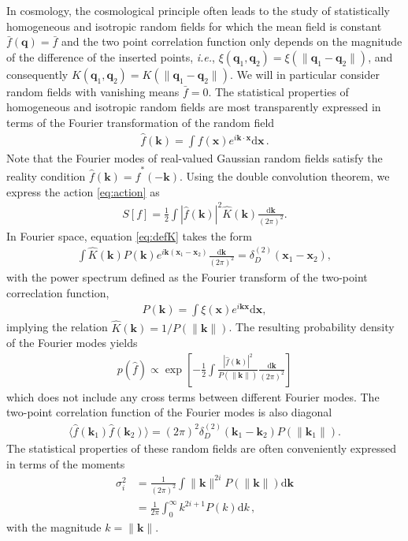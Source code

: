\documentclass[a4paper, 11pt]{article}
\begin{document}
In cosmology, the cosmological principle often leads to the study of statistically homogeneous and isotropic random fields for which the mean field is constant $\bar{f}(\bm{q})=\bar{f}$ and the two point correlation function only depends on the magnitude of the difference of the inserted points, \textit{i.e.}, $\xi(\bm{q}_1,\bm{q}_2)=\xi(\|\bm{q}_1-\bm{q}_2\|)$, and consequently $K(\bm{q}_1,\bm{q}_2)=K(\|\bm{q}_1-\bm{q}_2\|)$. We will in particular consider random fields with vanishing means $\bar{f}=0$. The statistical properties of homogeneous and isotropic random fields are most transparently expressed in terms of the Fourier transformation of the random field
\begin{align}
\hat{f}(\bm{k}) = \int f(\bm{x})e^{i\bm{k}\cdot \bm{x}}\mathrm{d}\bm{x}\,.
\end{align}
Note that the Fourier modes of real-valued Gaussian random fields satisfy the reality condition $\hat{f}(\bm{k}) = \hat{f}^*(-\bm{k})$. Using the double convolution theorem, we express the action \eqref{eq:action} as
\begin{align}
S[f] = \frac{1}{2} \int |\hat{f}(\bm{k})|^2 \hat{K}(\bm{k}) \frac{\mathrm{d}\bm{k}}{(2\pi)^2}.
\end{align}
In Fourier space, equation \eqref{eq:defK} takes the form
\begin{align}
\int \hat{K}(\bm{k}) P(\bm{k}) e^{i\bm{k}(\bm{x}_1-\bm{x}_2)} \frac{\mathrm{d}\bm{k}}{(2\pi)^2} = \delta_D^{(2)}(\bm{x}_1 - \bm{x}_2),
\end{align}
with the power spectrum defined as the Fourier transform of the two-point correclation function,
\begin{align}
P(\bm{k}) = \int \xi(\bm{x}) e^{i\bm{k}\bm{x}}\mathrm{d}\bm{x},
\end{align}
implying the relation $\hat{K}(\bm{k}) = 1/P(\|\bm{k}\|)$. The resulting probability density of the Fourier modes yields
\begin{align}
p(\hat{f}) \propto \exp\left[ -\frac{1}{2} \int \frac{|\hat{f}(\bm{k})|^2}{P(\|\bm{k}\|)} \frac{\mathrm{d}\bm{k}}{(2\pi)^2}\right]
\end{align}
which does not include any cross terms between different Fourier modes. The two-point correlation function of the Fourier modes is also diagonal
\begin{align}
\langle \hat{f}(\bm{k}_1)\hat{f}(\bm{k}_2) \rangle = (2\pi)^2 \delta_D^{(2)}(\bm{k}_1-\bm{k}_2) P(\|\bm{k}_1\|).
\end{align}
The statistical properties of these random fields are often conveniently expressed in terms of the moments
\begin{align}
\sigma_i^2 &= \frac{1}{(2\pi)^2} \int \|\bm{k}\|^{2i}P(\|\bm{k}\|)\mathrm{d}\bm{k}\nonumber\\
&= \frac{1}{2\pi} \int_0^\infty k^{2i+1}P(k)\mathrm{d}k\,,
\end{align}
with the magnitude $k = \|\bm{k}\|$.
\end{document}
